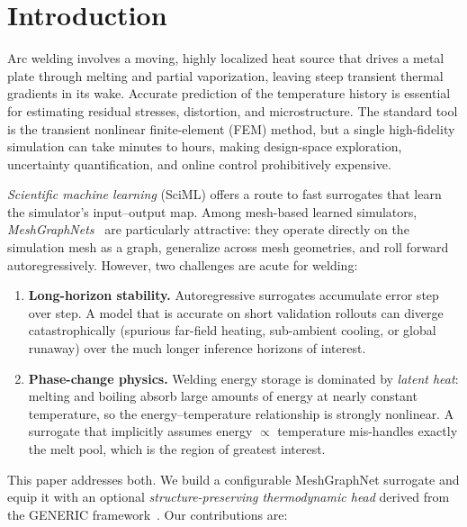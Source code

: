 \documentclass[11pt]{article}
\theoremstyle{definition}
\begin{document}
\tableofcontents

\section{Introduction}

Arc welding involves a moving, highly localized heat source that drives a metal
plate through melting and partial vaporization, leaving steep transient thermal
gradients in its wake. Accurate prediction of the temperature history is essential
for estimating residual stresses, distortion, and microstructure. The standard tool
is the transient nonlinear finite-element (FEM) method, but a single high-fidelity
simulation can take minutes to hours, making design-space exploration,
uncertainty quantification, and online control prohibitively expensive.

\emph{Scientific machine learning} (SciML) offers a route to fast surrogates that
learn the simulator's input--output map. Among mesh-based learned simulators,
\emph{MeshGraphNets}~\cite{pfaff2021learning} are particularly attractive: they
operate directly on the simulation mesh as a graph, generalize across mesh
geometries, and roll forward autoregressively. However, two challenges are acute
for welding:

\begin{enumerate}[leftmargin=1.4em]
  \item \textbf{Long-horizon stability.} Autoregressive surrogates accumulate
  error step over step. A model that is accurate on short validation rollouts can
  diverge catastrophically (spurious far-field heating, sub-ambient cooling, or
  global runaway) over the much longer inference horizons of interest.
  \item \textbf{Phase-change physics.} Welding energy storage is dominated by
  \emph{latent heat}: melting and boiling absorb large amounts of energy at nearly
  constant temperature, so the energy--temperature relationship is strongly
  nonlinear. A surrogate that implicitly assumes energy $\propto$ temperature
  mis-handles exactly the melt pool, which is the region of greatest interest.
\end{enumerate}

This paper addresses both. We build a configurable MeshGraphNet surrogate and equip
it with an optional \emph{structure-preserving thermodynamic head} derived from the
GENERIC framework~\cite{grmela1997dynamics,ottinger2005beyond}. Our contributions are:
\end{document}
